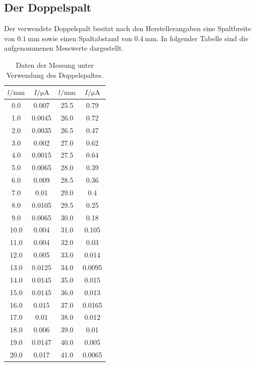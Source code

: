 \subsection{Der Doppelspalt}
Der verwendete Doppelspalt besitzt nach den Herstellerangaben eine Spaltbreite von
$\SI{0.1}{\milli\meter}$ sowie einen Spaltabstand von $\SI{0.4}{\milli\meter}$.
In folgender Tabelle sind die aufgenommenen Messwerte dargestellt.
\begin{table}[H]
  \centering
    \caption{Daten der Messung unter Verwendung des Doppelspaltes.}
    \label{tab:doppelspalt1}
    \begin{tabular}
      {S S[table-format=1.5] S S[table-format=1.5]}
      \toprule
      {$l / \si{\milli\meter}$} & {$I / \si{\micro\ampere}$} & {$l / \si{\milli\meter}$} & {$I / \si{\micro\ampere}$} \\
        & 0.007    & 25.5 & 0.79  \\
      1.0  & 0.0045   & 26.0 & 0.72  \\
      2.0  & 0.0035   & 26.5 & 0.47  \\
      3.0  & 0.002    & 27.0 & 0.62  \\
      4.0  & 0.0015   & 27.5 & 0.64  \\
      5.0  & 0.0065   & 28.0 & 0.39  \\
      6.0  & 0.009    & 28.5 & 0.36  \\
      7.0  & 0.01     & 29.0 & 0.4  \\
      8.0  & 0.0105   & 29.5 & 0.25  \\
      9.0  & 0.0065   & 30.0 & 0.18  \\
      10.0 & 0.004    & 31.0 & 0.105  \\
      11.0 & 0.004    & 32.0 & 0.03  \\
      12.0 & 0.005    & 33.0 & 0.014  \\
      13.0 & 0.0125   & 34.0 & 0.0095  \\
      14.0 & 0.0145   & 35.0 & 0.015  \\
      15.0 & 0.0145   & 36.0 & 0.013  \\
      16.0 & 0.015    & 37.0 & 0.0165  \\
      17.0 & 0.01     & 38.0 & 0.012  \\
      18.0 & 0.006    & 39.0 & 0.01  \\
      19.0 & 0.0147   & 40.0 & 0.005  \\
      20.0 & 0.017    & 41.0 & 0.0065  \\

\end{tabular}
\end{table}
